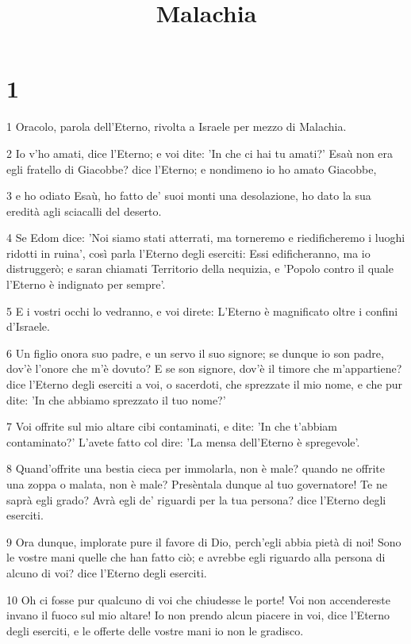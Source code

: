 

\title{Malachia}


\chapter{1}

\par 1 Oracolo, parola dell'Eterno, rivolta a Israele per mezzo di Malachia.
\par 2 Io v'ho amati, dice l'Eterno; e voi dite: 'In che ci hai tu amati?' Esaù non era egli fratello di Giacobbe? dice l'Eterno; e nondimeno io ho amato Giacobbe,
\par 3 e ho odiato Esaù, ho fatto de' suoi monti una desolazione, ho dato la sua eredità agli sciacalli del deserto.
\par 4 Se Edom dice: 'Noi siamo stati atterrati, ma torneremo e riedificheremo i luoghi ridotti in ruina', così parla l'Eterno degli eserciti: Essi edificheranno, ma io distruggerò; e saran chiamati Territorio della nequizia, e 'Popolo contro il quale l'Eterno è indignato per sempre'.
\par 5 E i vostri occhi lo vedranno, e voi direte: L'Eterno è magnificato oltre i confini d'Israele.
\par 6 Un figlio onora suo padre, e un servo il suo signore; se dunque io son padre, dov'è l'onore che m'è dovuto? E se son signore, dov'è il timore che m'appartiene? dice l'Eterno degli eserciti a voi, o sacerdoti, che sprezzate il mio nome, e che pur dite: 'In che abbiamo sprezzato il tuo nome?'
\par 7 Voi offrite sul mio altare cibi contaminati, e dite: 'In che t'abbiam contaminato?' L'avete fatto col dire: 'La mensa dell'Eterno è spregevole'.
\par 8 Quand'offrite una bestia cieca per immolarla, non è male? quando ne offrite una zoppa o malata, non è male? Presèntala dunque al tuo governatore! Te ne saprà egli grado? Avrà egli de' riguardi per la tua persona? dice l'Eterno degli eserciti.
\par 9 Ora dunque, implorate pure il favore di Dio, perch'egli abbia pietà di noi! Sono le vostre mani quelle che han fatto ciò; e avrebbe egli riguardo alla persona di alcuno di voi? dice l'Eterno degli eserciti.
\par 10 Oh ci fosse pur qualcuno di voi che chiudesse le porte! Voi non accendereste invano il fuoco sul mio altare! Io non prendo alcun piacere in voi, dice l'Eterno degli eserciti, e le offerte delle vostre mani io non le gradisco.
